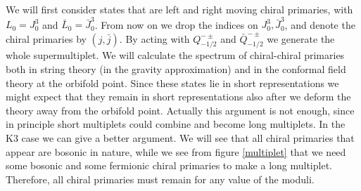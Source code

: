 We will first consider states that are left and right moving chiral
primaries, with $L_0 = J^3_0 $ and $\bar L_0 = \bar J_0^3 $.
From now on we drop the indices on $J^3_0, \bar J_0^3$,
and denote the chiral primaries by $(j,\bar j)$. 
By acting with $Q^{-\pm}_{-1/2}$ and $\bar Q^{-\pm}_{-1/2}$
we generate the whole supermultiplet.
We will calculate the spectrum of chiral-chiral primaries both 
in string theory (in the gravity approximation)
and in the conformal field theory at the orbifold point. Since these states
lie in short representations we might expect that
they remain in short representations also
after we deform the theory away from the orbifold point. 
Actually this argument is not enough, since in principle
short multiplets could combine and become long multiplets.
In the K3 case we can give a better argument. We will see that
all chiral primaries  that appear are bosonic in nature, while we
see from figure \ref{multiplet} that we need some bosonic and 
some fermionic chiral primaries to make a long multiplet.
Therefore, all chiral primaries must remain for any value of the
moduli.
  
